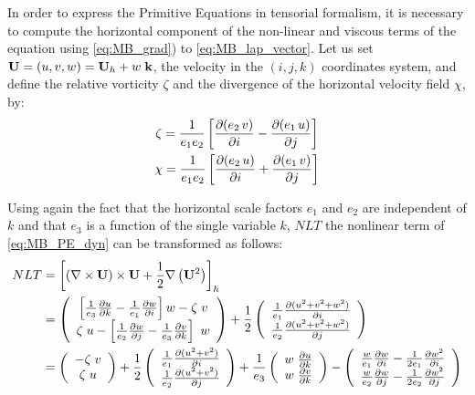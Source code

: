 \documentclass[../main/NEMO_manual]{subfiles}
\begin{document}
In order to express the Primitive Equations in tensorial formalism,
it is necessary to compute the horizontal component of the non-linear and viscous terms of
the equation using \autoref{eq:MB_grad}) to \autoref{eq:MB_lap_vector}.
Let us set $\mathbf{U} = (u,v,w) = \mathbf{U}_h + w \; \mathbf{k} $,
the velocity in the $(i,j,k)$ coordinates system,
and define the relative vorticity $\zeta$ and the divergence of the horizontal velocity field $\chi$,
by:
\begin{gather}
  \label{eq:MB_curl_Uh}
  \zeta = \frac{1}{e_1 e_2} \lt[ \pd[(e_2 \, v)]{i} - \pd[(e_1 \, u)]{j} \rt] \\
  \label{eq:MB_div_Uh}
  \chi  = \frac{1}{e_1 e_2} \lt[ \pd[(e_2 \, u)]{i} + \pd[(e_1 \, v)]{j} \rt]
\end{gather}

Using again the fact that the horizontal scale factors $e_1$ and $e_2$ are independent of $k$ and that
$e_3$  is a function of the single variable $k$,
$NLT$ the nonlinear term of \autoref{eq:MB_PE_dyn} can be transformed as follows:
\begin{align*}
  NLT &= \lt[ (\nabla \times {\vect U}) \times {\vect U} + \frac{1}{2} \nabla \lt( {\vect U}^2 \rt) \rt]_h \\
      &= \lt(
        \begin{array}{*{20}c}
          \lt[ \frac{1}{e_3} \pd[u]{k} - \frac{1}{e_1} \pd[w]{i} \rt] w - \zeta \; v   \\
          \zeta \; u - \lt[ \frac{1}{e_2} \pd[w]{j} - \frac{1}{e_3} \pd[v]{k} \rt] \ w
        \end{array}
  \rt)
  + \frac{1}{2} \lt(
  \begin{array}{*{20}c}
    \frac{1}{e_1} \pd[(u^2 + v^2 + w^2)]{i} \\
    \frac{1}{e_2} \pd[(u^2 + v^2 + w^2)]{j}
  \end{array}
  \rt) \\
      &= \lt(
        \begin{array}{*{20}c}
          -\zeta \; v \\
          \zeta \; u
        \end{array}
  \rt)
  + \frac{1}{2} \lt(
  \begin{array}{*{20}c}
    \frac{1}{e_1} \pd[(u^2 + v^2)]{i} \\
    \frac{1}{e_2} \pd[(u^2 + v^2)]{j}
  \end{array}
  \rt)
  + \frac{1}{e_3} \lt(
  \begin{array}{*{20}c}
    w \; \pd[u]{k} \\
    w \; \pd[v]{k}
  \end{array}
  \rt)
  - \lt(
  \begin{array}{*{20}c}
    \frac{w}{e_1} \pd[w]{i} - \frac{1}{2 e_1} \pd[w^2]{i} \\
    \frac{w}{e_2} \pd[w]{j} - \frac{1}{2 e_2} \pd[w^2]{j}
  \end{array}
  \rt)
\end{align*}
\end{document}
